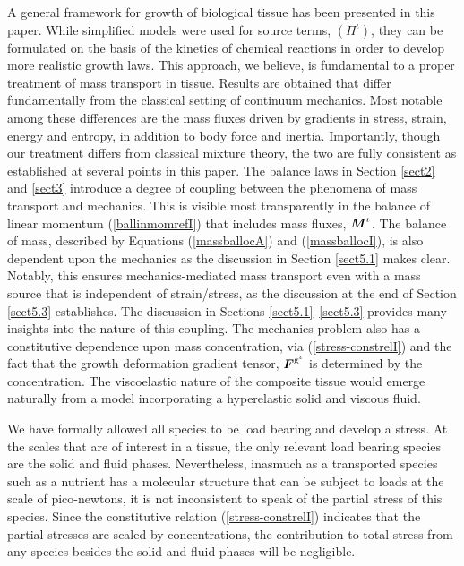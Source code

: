 A general framework for growth of biological tissue has been
presented in this paper. While simplified models were used for
source terms, $(\Pi^\iota)$, they can be formulated on the basis
of the kinetics of chemical reactions in order to develop more
realistic growth laws. This approach, we believe, is fundamental
to a proper treatment of mass transport in tissue. Results are
obtained that differ fundamentally from the classical setting of
continuum mechanics. Most notable among these differences are the
mass fluxes driven by gradients in stress, strain, energy and
entropy, in addition to body force and inertia. Importantly,
though our treatment differs from classical mixture theory, the
two are fully consistent as established at several points in this
paper. The balance laws in Section \ref{sect2} and \ref{sect3}
introduce a degree of coupling between the phenomena of mass
transport and mechanics. This is visible most transparently in the
balance of linear momentum (\ref{ballinmomrefI}) that includes
mass fluxes, $\mbox{\boldmath$ M$}^\iota$. The balance of mass, described by
Equations (\ref{massballocA}) and (\ref{massballocI}), is also
dependent upon the mechanics as the discussion in Section
\ref{sect5.1} makes clear. Notably, this ensures
mechanics-mediated mass transport even with a mass source that is
independent of strain/stress, as the discussion at the end of
Section \ref{sect5.3} establishes. The discussion in Sections
\ref{sect5.1}--\ref{sect5.3} provides many insights into the
nature of this coupling. The mechanics problem also has a
constitutive dependence upon mass concentration, via
(\ref{stress-constrelI}) and the fact that the growth deformation
gradient tensor, $\mbox{\boldmath$ F$}^{\mathrm{g}^\iota}$ is determined by the
concentration. The viscoelastic nature of the composite tissue
would emerge naturally from a model incorporating a hyperelastic
solid and viscous fluid.

We have formally allowed all species to be load bearing and
develop a stress. At the scales that are of interest in a tissue,
the only relevant load bearing species are the solid and fluid
phases. Nevertheless, inasmuch as a transported species such as a
nutrient has a molecular structure that can be subject to loads at
the scale of pico-newtons, it is not inconsistent to speak of the
partial stress of this species. Since the constitutive relation
(\ref{stress-constrelI}) indicates that the partial stresses are
scaled by concentrations, the contribution to total stress from
any species besides the solid and fluid phases will be negligible.

